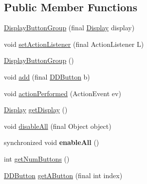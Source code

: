\subsection*{Public Member Functions}
\begin{DoxyCompactItemize}
\item 
\hyperlink{classgov_1_1fnal_1_1ppd_1_1dd_1_1util_1_1specific_1_1DisplayButtonGroup_a6f9718d1b768e1fa3eda6a3a4eb69d40}{Display\-Button\-Group} (final \hyperlink{interfacegov_1_1fnal_1_1ppd_1_1dd_1_1signage_1_1Display}{Display} display)
\item 
void \hyperlink{classgov_1_1fnal_1_1ppd_1_1dd_1_1util_1_1specific_1_1DisplayButtonGroup_a545327f6d7ef9578d104b127a6c82d24}{set\-Action\-Listener} (final Action\-Listener L)
\item 
\hyperlink{classgov_1_1fnal_1_1ppd_1_1dd_1_1util_1_1specific_1_1DisplayButtonGroup_aa923be0edd34fa1f305617331dc319b0}{Display\-Button\-Group} ()
\item 
void \hyperlink{classgov_1_1fnal_1_1ppd_1_1dd_1_1util_1_1specific_1_1DisplayButtonGroup_a17247fef1235129760371a73db7ac4d0}{add} (final \hyperlink{classgov_1_1fnal_1_1ppd_1_1dd_1_1changer_1_1DDButton}{D\-D\-Button} b)
\item 
void \hyperlink{classgov_1_1fnal_1_1ppd_1_1dd_1_1util_1_1specific_1_1DisplayButtonGroup_a32cc420f7da391926d3409690f5ddf55}{action\-Performed} (Action\-Event ev)
\item 
\hyperlink{interfacegov_1_1fnal_1_1ppd_1_1dd_1_1signage_1_1Display}{Display} \hyperlink{classgov_1_1fnal_1_1ppd_1_1dd_1_1util_1_1specific_1_1DisplayButtonGroup_a65b7c3ebe0e08f2251a61bc8aa4ba573}{get\-Display} ()
\item 
void \hyperlink{classgov_1_1fnal_1_1ppd_1_1dd_1_1util_1_1specific_1_1DisplayButtonGroup_a6b4d63b4caabfe2bb8bc321466e5d1a4}{disable\-All} (final Object object)
\item 
\hypertarget{classgov_1_1fnal_1_1ppd_1_1dd_1_1util_1_1specific_1_1DisplayButtonGroup_a62ff8f4f3c41684101239ee45ad1a397}{synchronized void {\bfseries enable\-All} ()}\label{classgov_1_1fnal_1_1ppd_1_1dd_1_1util_1_1specific_1_1DisplayButtonGroup_a62ff8f4f3c41684101239ee45ad1a397}

\item 
int \hyperlink{classgov_1_1fnal_1_1ppd_1_1dd_1_1util_1_1specific_1_1DisplayButtonGroup_ad4eaf31c8517f16fd68991cedcf0e0ca}{get\-Num\-Buttons} ()
\item 
\hyperlink{classgov_1_1fnal_1_1ppd_1_1dd_1_1changer_1_1DDButton}{D\-D\-Button} \hyperlink{classgov_1_1fnal_1_1ppd_1_1dd_1_1util_1_1specific_1_1DisplayButtonGroup_a81d575f445c7ae52a78facdf423ca8b2}{get\-A\-Button} (final int index)
\end{DoxyCompactItemize}


